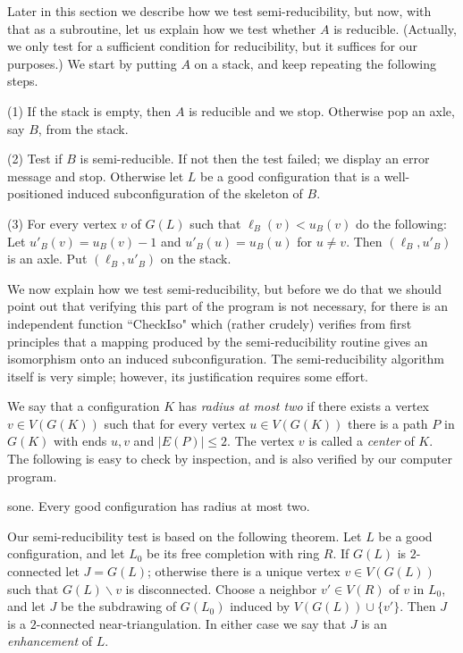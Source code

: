 Later in this section we describe how we test semi-reducibility, but now, 
with that as a subroutine,
let us explain how we test whether $A$ is reducible. (Actually,
we only test for a sufficient condition for reducibility, but it
suffices for our purposes.) We
start by putting  $A$ on a stack,
and keep repeating the following steps.  
\item{(1)} If the stack is empty, then $A$ is reducible and we stop.  
Otherwise pop an axle,
say $B$, from the stack.
\item{(2)} Test if $B$ is semi-reducible.  If not then the test
failed; we display an error message and stop.
Otherwise let $L$ be a good configuration that is a well-positioned
induced subconfiguration of the skeleton of $B$.
\item{(3)} For every vertex $v$ of $G(L)$ such that $\ell_B(v)<u_B(v)$ 
do the following:
 Let $u'_B(v)=u_B(v)-1$ and $u'_B(u)=u_B(u)$ for $u\ne v$.  
Then
$(\ell_B,u'_B)$ is an axle.
 Put $(\ell_B,u'_B)$ on the stack.

We now explain how we test semi-reducibility, but before we do that
we should point out that verifying this part of the program is
not necessary, for there is an independent function ``CheckIso"
which (rather crudely) verifies from first principles that a mapping
produced by the semi-reducibility routine gives an isomorphism onto an
induced subconfiguration. The semi-reducibility algorithm itself
is very simple; however, its justification requires some effort.

We say that a configuration  $K$ has {\it radius
at most two} if there exists a vertex $v\in V(G(K))$ such that for every 
vertex
$u\in V(G(K))$ there is a path $P$ in $G(K)$ with ends $u,v$ and $|E(P)|\le 
2$.
The vertex $v$ is called a {\it center} of $K$.  The following is easy 
to check by inspection,
and is also verified by our computer program.

\thm sone.  Every good configuration has radius at most two.

Our semi-reducibility test is based on the following theorem. Let $L$
be a good configuration, and let $L_0$ be its free completion with ring $R$.
If $G(L)$ is $2$-connected let $J=G(L)$; otherwise there is a unique
vertex $v\in V(G(L))$ such that $G(L)\backslash v$ is disconnected.
Choose a neighbor $v'\in V(R)$ of $v$ in $L_0$, and let $J$ be the
subdrawing of $G(L_0)$ induced by $V(G(L))\cup\{v'\}$. Then $J$ is a
$2$-connected near-triangulation. In either case we say that $J$ is
an {\it enhancement} of $L$.

